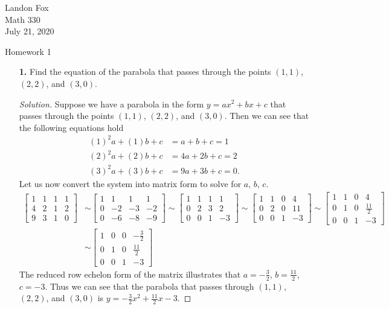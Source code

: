 \documentclass[ 12pt ]{article}
\begin{document}
\noindent Landon Fox \\
\noindent Math 330 \\
\noindent July 21, 2020

\begin{center}
\Large Homework 1
\end{center}

\begin{enumerate}
	\item[\textbf{1.}] Find the equation of the parabola that passes through the points $(1,1)$, $(2,2)$, and $(3,0)$.

	\begin{proof}[Solution]\renewcommand{\qedsymbol}{}
		Suppose we have a parabola in the form $y = ax^2 + bx + c$ that passes through the points $(1,1)$, $(2,2)$, and $(3,0)$. Then we can see that the following equations
		hold
		\begin{align*}
			(1)^2a + (1)b + c &= a + b + c = 1 \\
			(2)^2a + (2)b + c &= 4a + 2b + c = 2 \\
			(3)^2a + (3)b + c &= 9a + 3b + c = 0.
		\end{align*}
		Let us now convert the system into matrix form to solve for $a$, $b$, $c$.
		\begin{align*}
			\begin{bmatrix} 1 & 1 & 1 & 1 \\ 4 & 2 & 1 & 2 \\ 9 & 3 & 1 & 0 \end{bmatrix}
			&\sim \begin{bmatrix} 1 & 1 & 1 & 1 \\ 0 & -2 & -3 & -2 \\ 0 & -6 & -8 & -9 \end{bmatrix}
			\sim \begin{bmatrix} 1 & 1 & 1 & 1 \\ 0 & 2 & 3 & 2 \\ 0 & 0 & 1 & -3 \end{bmatrix}
			\sim \begin{bmatrix} 1 & 1 & 0 & 4 \\ 0 & 2 & 0 & 11 \\ 0 & 0 & 1 & -3 \end{bmatrix}
			\sim \begin{bmatrix} 1 & 1 & 0 & 4 \\ 0 & 1 & 0 & \frac{11}{2} \\ 0 & 0 & 1 & -3 \end{bmatrix} \\
			&\sim \begin{bmatrix} 1 & 0 & 0 & -\frac{3}{2} \\ 0 & 1 & 0 & \frac{11}{2} \\ 0 & 0 & 1 & -3 \end{bmatrix}
		\end{align*}
		The reduced row echelon form of the matrix illustrates that $a=-\frac{3}{2}$, $b=\frac{11}{2}$, $c=-3$. Thus we can see that the parabola that passes through 
		$(1,1)$, $(2,2)$, and $(3,0)$ is $y = -\frac{3}{2}x^2 + \frac{11}{2}x - 3$.
	\end{proof}



\end{enumerate}
\end{document}
